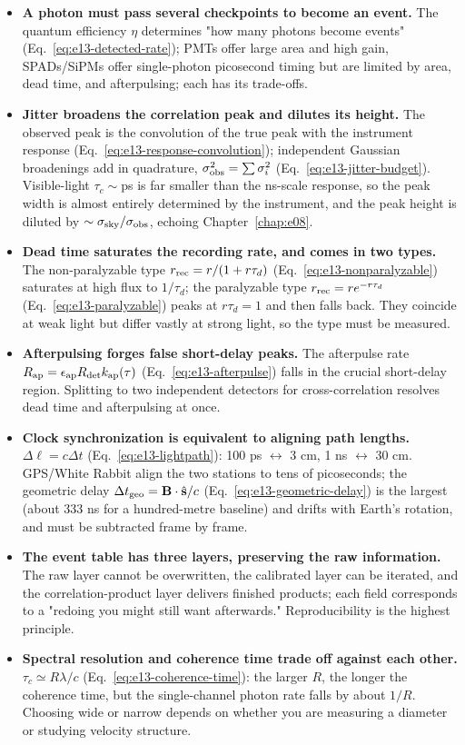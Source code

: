\begin{itemize}
  \item \textbf{A photon must pass several checkpoints to become an event.} The quantum efficiency $\eta$ determines "how many photons become events" (Eq.~\eqref{eq:e13-detected-rate}); PMTs offer large area and high gain, SPADs/SiPMs offer single-photon picosecond timing but are limited by area, dead time, and afterpulsing; each has its trade-offs.
  \item \textbf{Jitter broadens the correlation peak and dilutes its height.} The observed peak is the convolution of the true peak with the instrument response (Eq.~\eqref{eq:e13-response-convolution}); independent Gaussian broadenings add in quadrature, $\sigma_{\rm obs}^2=\sum\sigma_i^2$ (Eq.~\eqref{eq:e13-jitter-budget}). Visible-light $\tau_c\sim$ps is far smaller than the ns-scale response, so the peak width is almost entirely determined by the instrument, and the peak height is diluted by $\sim\sigma_{\rm sky}/\sigma_{\rm obs}$, echoing Chapter~\ref{chap:e08}.
  \item \textbf{Dead time saturates the recording rate, and comes in two types.} The non-paralyzable type $r_{\rm rec}=r/(1+r\tau_d)$ (Eq.~\eqref{eq:e13-nonparalyzable}) saturates at high flux to $1/\tau_d$; the paralyzable type $r_{\rm rec}=re^{-r\tau_d}$ (Eq.~\eqref{eq:e13-paralyzable}) peaks at $r\tau_d=1$ and then falls back. They coincide at weak light but differ vastly at strong light, so the type must be measured.
  \item \textbf{Afterpulsing forges false short-delay peaks.} The afterpulse rate $R_{\rm ap}=\epsilon_{\rm ap}R_{\rm det}k_{\rm ap}(\tau)$ (Eq.~\eqref{eq:e13-afterpulse}) falls in the crucial short-delay region. Splitting to two independent detectors for cross-correlation resolves dead time and afterpulsing at once.
  \item \textbf{Clock synchronization is equivalent to aligning path lengths.} $\Delta\ell=c\Delta t$ (Eq.~\eqref{eq:e13-lightpath}): 100 ps $\leftrightarrow$ 3 cm, 1 ns $\leftrightarrow$ 30 cm. GPS/White Rabbit align the two stations to tens of picoseconds; the geometric delay $\Delta t_{\rm geo}=\mathbf B\cdot\hat{\mathbf s}/c$ (Eq.~\eqref{eq:e13-geometric-delay}) is the largest (about 333 ns for a hundred-metre baseline) and drifts with Earth's rotation, and must be subtracted frame by frame.
  \item \textbf{The event table has three layers, preserving the raw information.} The raw layer cannot be overwritten, the calibrated layer can be iterated, and the correlation-product layer delivers finished products; each field corresponds to a "redoing you might still want afterwards." Reproducibility is the highest principle.
  \item \textbf{Spectral resolution and coherence time trade off against each other.} $\tau_c\simeq R\lambda/c$ (Eq.~\eqref{eq:e13-coherence-time}): the larger $R$, the longer the coherence time, but the single-channel photon rate falls by about $1/R$. Choosing wide or narrow depends on whether you are measuring a diameter or studying velocity structure.
\end{itemize}

